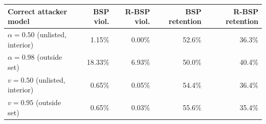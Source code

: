 \begin{tabular}{lrrrr}
\toprule
Correct attacker model & BSP viol. & R-BSP viol. & BSP retention & R-BSP retention \\
\midrule
$\alpha=0.50$ (unlisted, interior) & 1.15\% & 0.00\% & 52.6\% & 36.3\% \\
$\alpha=0.98$ (outside set) & 18.33\% & 6.93\% & 50.0\% & 40.4\% \\
$v=0.50$ (unlisted, interior) & 0.65\% & 0.05\% & 54.4\% & 36.4\% \\
$v=0.95$ (outside set) & 0.65\% & 0.03\% & 55.6\% & 35.4\% \\
\bottomrule
\end{tabular}
